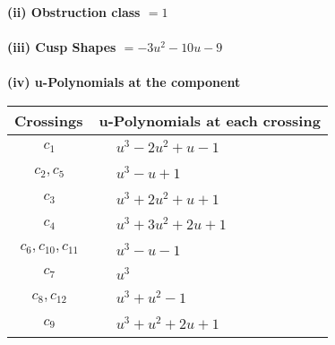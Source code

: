 \documentclass[1p]{elsarticle_modified}
\theoremstyle{definition}
\begin{document}
\flushleft \textbf{(ii) Obstruction class $= 1$}\\~\\
\flushleft \textbf{(iii) Cusp Shapes $= -3 u^2-10 u-9$}\\~\\
\newpage\renewcommand{\arraystretch}{1}
\flushleft \textbf{(iv) u-Polynomials at the component}\newline \\
\begin{tabular}{m{50pt}|m{274pt}}
Crossings & \hspace{64pt}u-Polynomials at each crossing \\
\hline $$\begin{aligned}c_{1}\end{aligned}$$&$\begin{aligned}
&u^3-2 u^2+u-1
\end{aligned}$\\
\hline $$\begin{aligned}c_{2},c_{5}\end{aligned}$$&$\begin{aligned}
&u^3- u+1
\end{aligned}$\\
\hline $$\begin{aligned}c_{3}\end{aligned}$$&$\begin{aligned}
&u^3+2 u^2+u+1
\end{aligned}$\\
\hline $$\begin{aligned}c_{4}\end{aligned}$$&$\begin{aligned}
&u^3+3 u^2+2 u+1
\end{aligned}$\\
\hline $$\begin{aligned}c_{6},c_{10},c_{11}\end{aligned}$$&$\begin{aligned}
&u^3- u-1
\end{aligned}$\\
\hline $$\begin{aligned}c_{7}\end{aligned}$$&$\begin{aligned}
&u^3
\end{aligned}$\\
\hline $$\begin{aligned}c_{8},c_{12}\end{aligned}$$&$\begin{aligned}
&u^3+u^2-1
\end{aligned}$\\
\hline $$\begin{aligned}c_{9}\end{aligned}$$&$\begin{aligned}
&u^3+u^2+2 u+1
\end{aligned}$\\
\hline
\end{tabular}\\~\\
\end{document}

